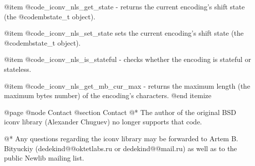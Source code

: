 @item
@code{_iconv_nls_get_state} - returns the current encoding's shift state
(the @code{mbstate_t} object).

@item
@code{_iconv_nls_set_state} sets the current encoding's shift state (the
@code{mbstate_t} object).

@item
@code{_iconv_nls_is_stateful} - checks whether the encoding is stateful
or stateless.

@item
@code{_iconv_nls_get_mb_cur_max} - returns the maximum length (the
maximum bytes number) of the encoding's characters.
@end itemize




@page
@node Contact
@section Contact
@*
The author of the original BSD iconv library (Alexander Chuguev) no longer
supports that code.

@*
Any questions regarding the iconv library may be forwarded to
Artem B. Bityuckiy (dedekind@@oktetlabs.ru or dedekind@@mail.ru) as
well as to the public Newlib mailing list.

